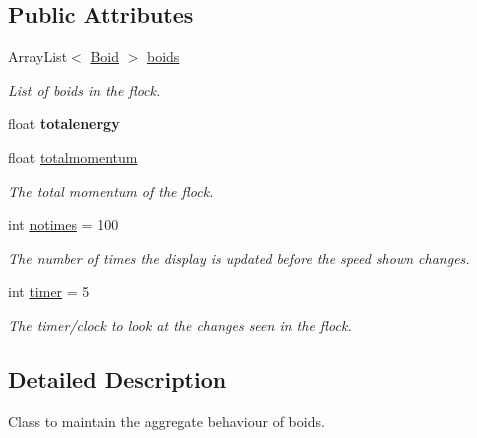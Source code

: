 \subsection*{Public Attributes}
\begin{DoxyCompactItemize}
\item 
\mbox{\label{class_flock_ab67c86a17efdfb6be0f017f659b7821f}} 
Array\+List$<$ \mbox{\hyperlink{class_boid}{Boid}} $>$ \mbox{\hyperlink{class_flock_ab67c86a17efdfb6be0f017f659b7821f}{boids}}
\begin{DoxyCompactList}\small\item\em List of boids in the flock. \end{DoxyCompactList}\item 
\mbox{\label{class_flock_ad6cf459570d3dee5629b7c67da067a22}} 
float {\bfseries totalenergy}
\item 
\mbox{\label{class_flock_a3ef45d17f9335a84a5d025081f416993}} 
float \mbox{\hyperlink{class_flock_a3ef45d17f9335a84a5d025081f416993}{totalmomentum}}
\begin{DoxyCompactList}\small\item\em The total momentum of the flock. \end{DoxyCompactList}\item 
\mbox{\label{class_flock_af9391becaa97547437cb9b777416a1c0}} 
int \mbox{\hyperlink{class_flock_af9391becaa97547437cb9b777416a1c0}{notimes}} = 100
\begin{DoxyCompactList}\small\item\em The number of times the display is updated before the speed shown changes. \end{DoxyCompactList}\item 
\mbox{\label{class_flock_ac1822e0ef13d9eede3bf25c680f12f40}} 
int \mbox{\hyperlink{class_flock_ac1822e0ef13d9eede3bf25c680f12f40}{timer}} = 5
\begin{DoxyCompactList}\small\item\em The timer/clock to look at the changes seen in the flock. \end{DoxyCompactList}\end{DoxyCompactItemize}


\subsection{Detailed Description}
Class to maintain the aggregate behaviour of boids. 

